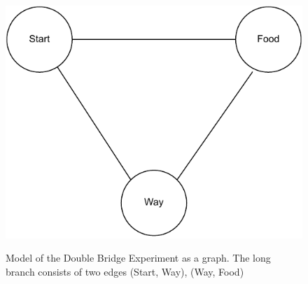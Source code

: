 \begin{figure}[h]
	\begin{centering}
		{\includegraphics[scale=0.5]{figures/background/double_bridge_graph.pdf}}
		\caption{Model of the Double Bridge Experiment as a graph. The long branch consists of two edges (Start, Way), (Way, Food)}
		\label{fig:double_bridge_graph}
	\end{centering}
\end{figure}
